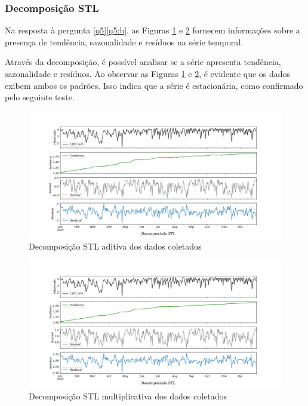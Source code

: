 \subsubsection{Decomposi\c c\~ao STL}\label{subsubsec:stl}



Na resposta à pergunta \ref{q5}\ref{q5:b}, as Figuras \ref{fig:stl-aditiva} e \ref{fig:stl} fornecem informações sobre a presença de tendência, sazonalidade e resíduos na série temporal.

Através da decomposição, é possível analisar se a série apresenta tendência, sazonalidade e resíduos. Ao observar as Figuras \ref{fig:stl-aditiva} e \ref{fig:stl}, é evidente que os dados exibem ambos os padrões. Isso indica que a série é estacionária, como confirmado pelo seguinte teste.

\begin{figure}[H]
	\centering
	\caption{Decomposição STL aditiva dos dados coletados}
	\label{fig:stl-aditiva}
	\includegraphics[width=0.9\linewidth]{"Resultados/Figuras/STL aditiva"}
	
\end{figure}

\begin{figure}[H]
	\centering
	\caption{Decomposição STL multiplicativa dos dados coletados}
	\label{fig:stl}
	\includegraphics[width=0.9\linewidth]{Resultados/Figuras/STL}
		
	
\end{figure}



